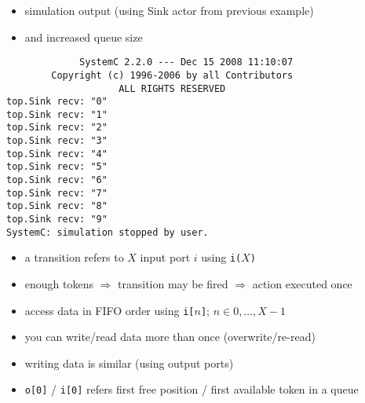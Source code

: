 \begin{frame}[fragile=singleslide]
\begin{itemize}
\item simulation output (using Sink actor from previous example)
\item and increased queue size
\end{itemize}
\begin{lstlisting}
             SystemC 2.2.0 --- Dec 15 2008 11:10:07
        Copyright (c) 1996-2006 by all Contributors
                    ALL RIGHTS RESERVED
top.Sink recv: "0"
top.Sink recv: "1"
top.Sink recv: "2"
top.Sink recv: "3"
top.Sink recv: "4"
top.Sink recv: "5"
top.Sink recv: "6"
top.Sink recv: "7"
top.Sink recv: "8"
top.Sink recv: "9"
SystemC: simulation stopped by user.
\end{lstlisting}
\end{frame}





\begin{frame}[fragile=singleslide]
\begin{center}
\resizebox{0.95\columnwidth}{!}{}
\end{center}
\begin{itemize}
\item a transition refers to $X$ input port $i$ using \lstinline!i(!$X$\lstinline!)!
\item enough tokens $\Rightarrow$ transition may be fired $\Rightarrow$ action executed once
\item access data in FIFO order using \lstinline!i[!$n$\lstinline!]!; $n \in {0, \dots, X-1}$
\item you can write/read data more than once (overwrite/re-read)
\item writing data is similar (using output ports)
\item \lstinline!o[0]! / \lstinline!i[0]! refers first free position / first available token in a queue
\end{itemize}
\end{frame}





